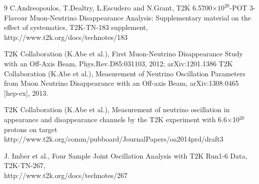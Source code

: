 \begin{thebibliography}{9}
%
%
  C.Andreopoulos, T.Dealtry, L.Escudero and N.Grant,
  T2K 6.5700$\times10^{20}$-POT 3-Flavour Muon-Neutrino Disappearance Analysis:
  Supplementary material on the effect of systematics,
  T2K-TN-183 supplement,\\
  http://www.t2k.org/docs/technotes/183

%
%
   T2K Collaboration (K.Abe et al.), 
   First Muon-Neutrino Disappearance Study with an Off-Axis Beam,
   Phys.Rev.D85:031103, 2012; arXiv:1201.1386
  T2K Collaboration (K.Abe et al.),
  Measurement of Neutrino Oscillation Parameters from Muon Neutrino Disappearance with an Off-axis Beam,
  arXiv:1308.0465 [hep-ex], 2013.
  
%
%
   T2K Collaboration (K.Abe et al.),
   Measurement of neutrino oscillation in appearance and disappearance channels by the T2K experiment with 
   6.6$\times$10$^{20}$ protons on target 
   http://www.t2k.org/comm/pubboard/JournalPapers/oa2014prd/draft3

%
%
J. Imber et al.,
Four Sample Joint Oscillation Analysis with T2K Run1-6 Data,
  T2K-TN-267,\\
 http://www.t2k.org/docs/technotes/267


\end{thebibliography}
